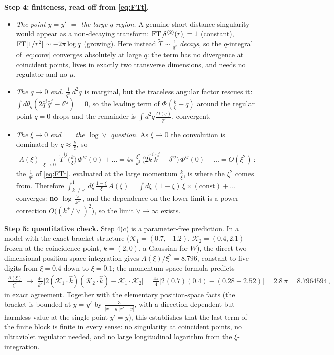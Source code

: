 \documentclass[9pt]{article}
\numberwithin{equation}{section}
\begin{document}
\textbf{Step 4: finiteness, read off from \eqref{eq:FTt}.}
\begin{itemize}
\item[(a)] \emph{The point $y=y'$ $=$ the large-$q$ region.} A genuine short-distance
singularity would appear as a non-decaying transform: ${\rm FT}[\delta^{(2)}(r)]=1$
(constant), ${\rm FT}[1/r^{2}]\sim-2\pi\log q$ (growing). Here instead
$\widetilde T\sim\frac{1}{q^{2}}$ \emph{decays}, so the $q$-integral of \eqref{eq:conv}
converges absolutely at large $q$: the term has no divergence at coincident points, lives in
exactly two transverse dimensions, and needs no regulator and no $\mu$.
\item[(b)] \emph{The $q\to0$ end.} $\frac{1}{q^{2}}\,d^{2}q$ is marginal, but the traceless
angular factor rescues it: $\int d\theta_{\hat q}(2\hat q^{i}\hat q^{j}-\delta^{ij})=0$, so
the leading term of $\Phi(\frac{k}{\xi}-q)$ around the regular point $q=0$ drops and the
remainder is $\int d^{2}q\,\frac{O(q)}{q^{2}}$, convergent.
\item[(c)] \emph{The $\xi\to0$ end $=$ the $\log\vee$ question.} As $\xi\to0$ the convolution
is dominated by $q\approx\frac{k}{\xi}$, so
\begin{align}
A(\xi)\;\xrightarrow[\xi\to0]{}\;
\widetilde T^{ij}\Big(\frac{k}{\xi}\Big)\,\Phi^{ij}(0)+\ldots
=4\pi\,\frac{\xi^{2}}{k^{2}}\,\big(2\hat k^{i}\hat k^{j}-\delta^{ij}\big)\,\Phi^{ij}(0)+\ldots
=O(\xi^{2})\,:
\end{align}
the $\frac{1}{q^{2}}$ of \eqref{eq:FTt}, evaluated at the large momentum $\frac{k}{\xi}$, is
where the $\xi^{2}$ comes from. Therefore
$\int_{k^{+}/\vee}^{1}d\xi\,\frac{1-\xi}{\xi}\,A(\xi)
=\int d\xi\,(1-\xi)\,\xi\times(\text{const})+\ldots$ converges: \textbf{no
$\log\frac{\vee}{k^{+}}$}, and the dependence on the lower limit is a power correction
$O\big((k^{+}/\vee)^{2}\big)$, so the limit $\vee\to\infty$ exists.
\end{itemize}

\textbf{Step 5: quantitative check.} Step 4(c) is a parameter-free prediction. In a model
with the exact bracket structure ($\mathcal K_{1}=(0.7,-1.2)$, $\mathcal K_{2}=(0.4,2.1)$
frozen at the coincidence point, $k=(2,0)$, a Gaussian for $W$), the direct two-dimensional
position-space integration gives $A(\xi)/\xi^{2}=8.796$, constant to five digits from
$\xi=0.4$ down to $\xi=0.1$; the momentum-space formula predicts
\begin{align}
\frac{A(\xi)}{\xi^{2}}\;\to\;\frac{4\pi}{k^{2}}
\Big[2(\mathcal K_{1}\!\cdot\!\hat k)(\mathcal K_{2}\!\cdot\!\hat k)
-\mathcal K_{1}\!\cdot\!\mathcal K_{2}\Big]
=\frac{4\pi}{4}\big[2(0.7)(0.4)-(0.28-2.52)\big]=2.8\,\pi=8.7964594\,,
\end{align}
in exact agreement. Together with the elementary position-space facts (the bracket is bounded
at $y=y'$ by $\frac{3}{|x-y||x'-y|}$, with a direction-dependent but harmless value at the
single point $y'=y$), this establishes that the last term of the finite block is finite in
every sense: no singularity at coincident points, no ultraviolet regulator needed, and no
large longitudinal logarithm from the $\xi$-integration.
\end{document}
